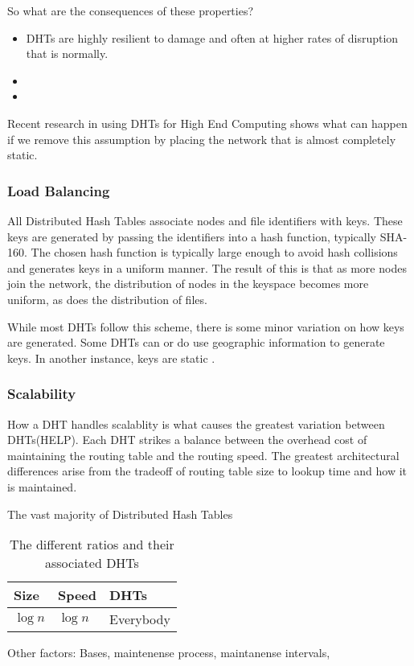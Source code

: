 \documentclass[10pt,letterpaper]{report}
\begin{document}
So what are the consequences of these properties?
\begin{itemize}
	\item DHTs are highly resilient to damage and often at higher rates of disruption that is normally.
	\item 
	\item 
\end{itemize}

Recent research in using DHTs for High End Computing \cite{zht} shows what can happen if we remove this assumption by placing the network that is almost completely static.



\subsubsection{Load Balancing}
All Distributed Hash Tables associate nodes and file identifiers with keys.  
These keys are generated by passing the identifiers into a hash function, typically SHA-160.
The chosen hash function is typically large enough to avoid hash collisions and generates keys in a uniform manner. 
The result of this is that as more nodes join the network, the distribution of nodes in the keyspace becomes more uniform, as does the distribution of files.

While most DHTs follow this scheme, there is some minor variation on how keys are generated.
Some DHTs can or do use geographic information to generate keys.
In another instance, keys are static \cite{vhash}.

\subsubsection{Scalability}
How a DHT handles scalablity is what causes the greatest variation between DHTs(HELP).
Each DHT strikes a balance between the overhead cost of maintaining the routing table and the routing speed. 
The greatest architectural differences arise from the tradeoff of routing table size  to lookup time and how it is maintained.

The vast majority of Distributed Hash Tables 


\begin{table}
  \centering
  \begin{tabular}{|l|l|l|}
  \hline
  Size & Speed & DHTs \\ \hline
  $\log n$ & $\log n$ & Everybody \\ \hline
  \end{tabular}
  \caption{The different ratios and their associated DHTs}
  \label{tab:tradeoffs}
\end{table}
Other factors: Bases, maintenense process, maintanense intervals,
\end{document}
